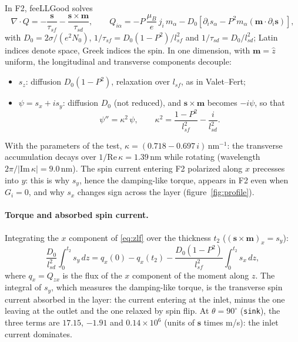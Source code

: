 \documentclass[11pt,a4paper]{article}
\newcommand{\vm}{\bm{m}}
\newcommand{\vs}{\bm{s}}
\begin{document}
In F2, feeLLGood solves
\begin{equation}
  \nabla\cdot Q = -\frac{\vs}{\tau_{sf}} - \frac{\vs\times\vm}{\tau_{sd}},
  \qquad
  Q_{i\alpha} = -P\,\frac{\mu_B}{e}\,j_i\,m_\alpha
  - D_0\left[\partial_i s_\alpha - P^2 m_\alpha(\vm\cdot\partial_i\vs)\right],
  \label{eq:zlf}
\end{equation}
with $D_0 = 2\sigma/(e^2N_0)$, $1/\tau_{sf} = D_0(1-P^2)/l_{sf}^2$ and
$1/\tau_{sd} = D_0/l_{sd}^2$; Latin indices denote space, Greek indices
the spin. In one dimension, with $\vm = \hat z$ uniform, the longitudinal
and transverse components decouple:
\begin{itemize}
  \item $s_z$: diffusion $D_0(1-P^2)$, relaxation over $l_{sf}$, as in
    Valet--Fert;
  \item $\psi = s_x + i s_y$: diffusion $D_0$ (not reduced), and
    $\vs\times\vm$ becomes $-i\psi$, so that
    \begin{equation}
      \psi'' = \kappa^2\,\psi,
      \qquad
      \kappa^2 = \frac{1-P^2}{l_{sf}^2} - \frac{i}{l_{sd}^2} .
    \end{equation}
\end{itemize}
With the parameters of the test, $\kappa = (0.718 - 0.697\,i)$\,nm$^{-1}$:
the transverse accumulation decays over $1/\mathrm{Re}\,\kappa = 1.39$\,nm
while rotating (wavelength $2\pi/|\mathrm{Im}\,\kappa| = 9.0$\,nm). The
spin current entering F2 polarized along $x$ precesses into $y$: this is
why $s_y$, hence the damping-like torque, appears in F2 even when
$G_i = 0$, and why $s_x$ changes sign across the layer
(figure~\ref{fig:profile}).

\paragraph{Torque and absorbed spin current.} Integrating the $x$
component of \eqref{eq:zlf} over the thickness $t_2$ ($(\vs\times\vm)_x =
s_y$):
\begin{equation}
  \frac{D_0}{l_{sd}^2}\int_0^{t_2} s_y\,dz
  = q_x(0) - q_x(t_2) - \frac{D_0(1-P^2)}{l_{sf}^2}\int_0^{t_2}s_x\,dz ,
\end{equation}
where $q_x = Q_{zx}$ is the flux of the $x$ component of the moment along
$z$. The integral of $s_y$, which measures the damping-like torque, is the
transverse spin current absorbed in the layer: the current entering at the
inlet, minus the one leaving at the outlet and the one relaxed by spin
flip. At $\theta = 90^\circ$ (\texttt{sink}), the three terms are
$17.15$, $-1.91$ and $0.14\times10^6$ (units of $\vs$ times m/s): the
inlet current dominates.
\end{document}
